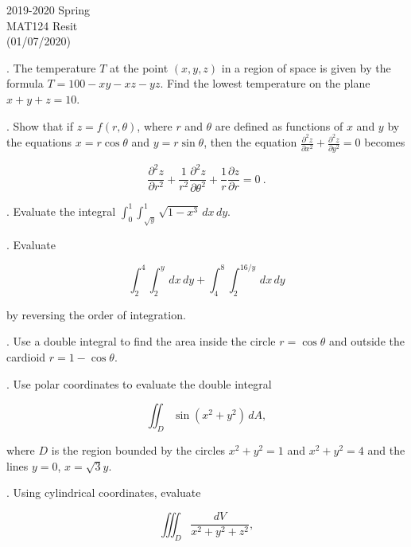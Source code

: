 \documentclass{article}
\begin{document}
\pagestyle{empty}
\large

\begin{center}
2019-2020 Spring \\MAT124 Resit\\(01/07/2020)
\end{center}

. The temperature $T$ at the point $(x,y,z)$ in a region of space is given by the formula $T=100-xy-xz-yz$. Find the lowest temperature on the plane $x+y+z=10$.

\hfill

. Show that if $z=f(r, \theta)$, where $r$ and $\theta$ are defined as functions of $x$ and $y$ by the equations $x=r\cos\theta$ and $y=r\sin\theta$, then the equation $\displaystyle\frac{\partial^2z}{\partial x^2}+\frac{\partial ^2z}{\partial y^2} = 0$ becomes

\begin{equation*}
    \frac{\partial^2z}{\partial r^2}+\frac{1}{r^2}\frac{\partial^2z}{\partial\theta^2}+\frac{1}{r}\frac{\partial z}{\partial r}  = 0\:.
\end{equation*}

\hfill

. Evaluate the integral $\displaystyle \int_0^1\int_{\sqrt y}^1 \sqrt{1-x^3}\,dx\,dy$.

\hfill

. Evaluate

\[\displaystyle \int_2^4\int_2^y\,dx\,dy + \int_4^8\int_2^{16/y}\,dx\,dy\]

\hfill

\noindent by reversing the order of integration.

\hfill

. Use a double integral to find the area inside the circle $r=\cos\theta$ and outside the cardioid $r=1-\cos\theta$.

\hfill

. Use polar coordinates to evaluate the double integral

\[\displaystyle\iint_D\sin\left(x^2+y^2\right)\,dA,\]

\hfill

\noindent where $D$ is the region bounded by the circles $x^2+y^2=1$ and $x^2+y^2=4$ and the lines $y=0$, $x=\sqrt3 y$.

\hfill

. Using cylindrical coordinates, evaluate

\[\iiint_D\frac{dV}{x^2+y^2+z^2},\]
\end{document}
